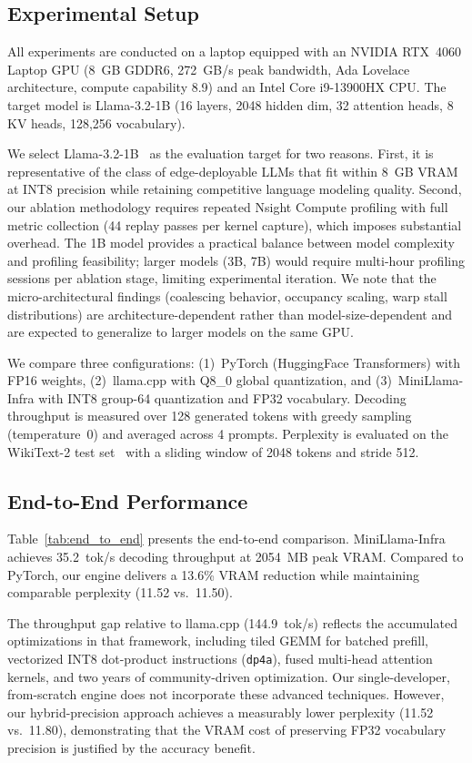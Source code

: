 \documentclass[conference]{IEEEtran}
\begin{document}
\subsection{Experimental Setup}
All experiments are conducted on a laptop equipped with an NVIDIA RTX~4060 Laptop GPU (8~GB GDDR6, 272~GB/s peak bandwidth, Ada Lovelace architecture, compute capability 8.9) and an Intel Core i9-13900HX CPU. The target model is Llama-3.2-1B (16 layers, 2048 hidden dim, 32 attention heads, 8 KV heads, 128,256 vocabulary).

We select Llama-3.2-1B~\cite{meta2024llama3} as the evaluation target for two reasons. First, it is representative of the class of edge-deployable LLMs that fit within 8~GB VRAM at INT8 precision while retaining competitive language modeling quality. Second, our ablation methodology requires repeated Nsight Compute profiling with full metric collection (44 replay passes per kernel capture), which imposes substantial overhead. The 1B model provides a practical balance between model complexity and profiling feasibility; larger models (3B, 7B) would require multi-hour profiling sessions per ablation stage, limiting experimental iteration. We note that the micro-architectural findings (coalescing behavior, occupancy scaling, warp stall distributions) are architecture-dependent rather than model-size-dependent and are expected to generalize to larger models on the same GPU.

We compare three configurations: (1)~PyTorch (HuggingFace Transformers) with FP16 weights, (2)~llama.cpp with Q8\_0 global quantization, and (3)~MiniLlama-Infra with INT8 group-64 quantization and FP32 vocabulary. Decoding throughput is measured over 128 generated tokens with greedy sampling (temperature~0) and averaged across 4 prompts. Perplexity is evaluated on the WikiText-2 test set~\cite{merity2016wikitext} with a sliding window of 2048 tokens and stride 512.

\subsection{End-to-End Performance}
Table~\ref{tab:end_to_end} presents the end-to-end comparison. MiniLlama-Infra achieves 35.2~tok/s decoding throughput at 2054~MB peak VRAM. Compared to PyTorch, our engine delivers a 13.6\% VRAM reduction while maintaining comparable perplexity (11.52 vs.\ 11.50).

The throughput gap relative to llama.cpp (144.9~tok/s) reflects the accumulated optimizations in that framework, including tiled GEMM for batched prefill, vectorized INT8 dot-product instructions (\texttt{dp4a}), fused multi-head attention kernels, and two years of community-driven optimization. Our single-developer, from-scratch engine does not incorporate these advanced techniques. However, our hybrid-precision approach achieves a measurably lower perplexity (11.52 vs.\ 11.80), demonstrating that the VRAM cost of preserving FP32 vocabulary precision is justified by the accuracy benefit.
\end{document}
